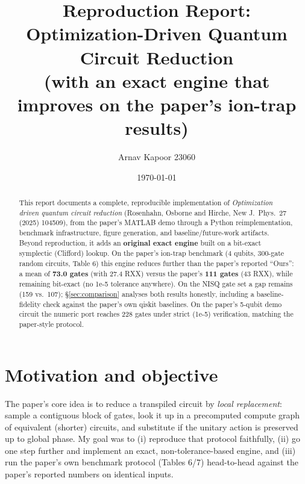 \documentclass[11pt,a4paper]{article}
\title{Reproduction Report: Optimization-Driven Quantum Circuit Reduction\\[4pt]
\large (with an exact engine that improves on the paper's ion-trap results)}
\author{Arnav Kapoor 23060}
\date{\today}
\begin{document}
\maketitle

\begin{abstract}
This report documents a complete, reproducible implementation of
\emph{Optimization driven quantum circuit reduction} (Rosenhahn, Osborne and
Hirche, New J.\ Phys.\ 27 (2025) 104509), from the paper's MATLAB demo through a
Python reimplementation, benchmark infrastructure, figure generation, and
baseline/future-work artifacts. Beyond reproduction, it adds an \textbf{original
exact engine} built on a bit-exact symplectic (Clifford) lookup. On the paper's
ion-trap benchmark (4 qubits, 300-gate random circuits, Table 6) this engine
reduces further than the paper's reported ``Ours'': a mean of \textbf{73.0
gates} (with 27.4 RXX) versus the paper's \textbf{111 gates} (43 RXX), while
remaining bit-exact (no 1e-5 tolerance anywhere). On the NISQ gate set a gap
remains (159 vs.\ 107); \S\ref{sec:comparison} analyses both results honestly,
including a baseline-fidelity check against the paper's own qiskit baselines.
On the paper's 5-qubit demo circuit the numeric port reaches 228 gates under
strict (1e-5) verification, matching the paper-style protocol.
\end{abstract}

\section{Motivation and objective}
The paper's core idea is to reduce a transpiled circuit by \emph{local
replacement}: sample a contiguous block of gates, look it up in a precomputed
compute graph of equivalent (shorter) circuits, and substitute if the unitary
action is preserved up to global phase. My goal was to (i) reproduce that
protocol faithfully, (ii) go one step further and implement an exact,
non-tolerance-based engine, and (iii) run the paper's own benchmark protocol
(Tables 6/7) head-to-head against the paper's reported numbers on identical
inputs.
\end{document}
